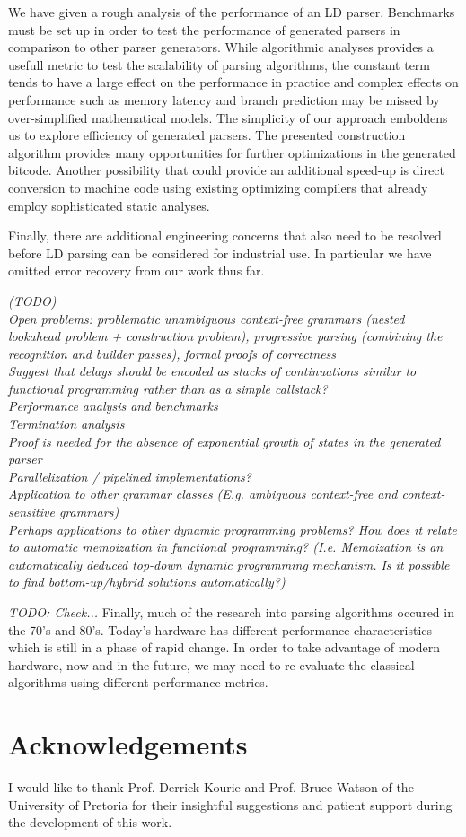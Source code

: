 \documentclass[a4paper,11pt]{article}
\begin{document}
We have given a rough analysis of the performance of an LD parser. 
Benchmarks must be set up in order to test the performance of generated parsers in comparison to other parser generators.
While algorithmic analyses provides a usefull metric to test the scalability of parsing algorithms, the constant term tends to have a large effect on the performance in practice and 
complex effects on performance such as memory latency and branch prediction may be missed by over-simplified mathematical models.
The simplicity of our approach emboldens us to explore efficiency of generated parsers.
The presented construction algorithm provides many opportunities for further optimizations in the generated bitcode.
Another possibility that could provide an additional speed-up is direct conversion to machine code using existing optimizing compilers that already employ sophisticated static analyses.

Finally, there are additional engineering concerns that also need to be resolved before LD parsing can be considered for industrial use.
In particular we have omitted error recovery from our work thus far.

\emph{ %
(TODO)\\
Open problems: problematic unambiguous context-free grammars (nested lookahead problem + construction problem), progressive parsing (combining the recognition and builder passes), formal proofs of correctness\\
Suggest that delays should be encoded as stacks of continuations similar to functional programming rather than as a simple callstack?\\
Performance analysis and benchmarks\\
Termination analysis\\
Proof is needed for the absence of exponential growth of states in the generated parser\\
Parallelization / pipelined implementations?\\
Application to other grammar classes (E.g. ambiguous context-free and context-sensitive grammars)\\
Perhaps applications to other dynamic programming problems? How does it relate to automatic memoization in functional programming? (I.e. Memoization is an automatically deduced top-down dynamic programming mechanism. Is it possible to find bottom-up/hybrid solutions automatically?)
}

\emph{TODO: Check...} Finally, much of the research into parsing algorithms occured in the 70's and 80's. Today's hardware has different performance characteristics which is still in a phase of rapid change. 
In order to take advantage of modern hardware, now and in the future, we may need to re-evaluate the classical algorithms using different performance metrics.

\section*{Acknowledgements}
I would like to thank Prof. Derrick Kourie and Prof. Bruce Watson of the University of Pretoria for their insightful suggestions and patient support during the development of this work.



\end{document}
